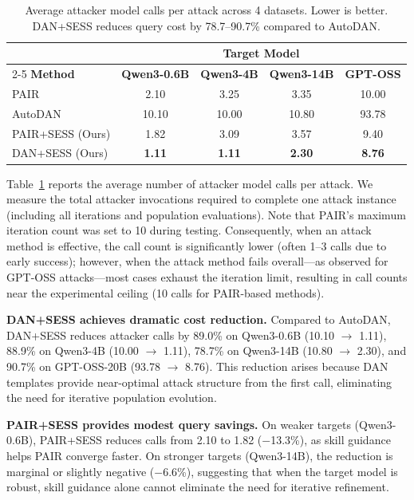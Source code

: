\documentclass[letterpaper]{article}
\begin{document}
\begin{table}[t]
\centering
\caption{Average attacker model calls per attack across 4 datasets. Lower is better. DAN+SESS reduces query cost by 78.7--90.7\% compared to AutoDAN.}
\label{tab:efficiency}
\footnotesize
\setlength{\tabcolsep}{0.5pt}
\begin{tabular}{lcccc}
\toprule
& \multicolumn{4}{c}{\textbf{Target Model}} \\
\cmidrule(lr){2-5}
\textbf{Method} & \textbf{Qwen3-0.6B} & \textbf{Qwen3-4B} & \textbf{Qwen3-14B} & \textbf{GPT-OSS} \\
\midrule
PAIR & 2.10 & 3.25 & 3.35 & 10.00 \\
AutoDAN & 10.10 & 10.00 & 10.80 & 93.78 \\
\midrule
PAIR+SESS (Ours) & 1.82 & 3.09 & 3.57 & 9.40 \\
DAN+SESS (Ours) & \textbf{1.11} & \textbf{1.11} & \textbf{2.30} & \textbf{8.76} \\
\bottomrule
\end{tabular}
\end{table}

Table~\ref{tab:efficiency} reports the average number of attacker model calls per attack. We measure the total attacker invocations required to complete one attack instance (including all iterations and population evaluations). Note that PAIR's maximum iteration count was set to 10 during testing. Consequently, when an attack method is effective, the call count is significantly lower (often 1--3 calls due to early success); however, when the attack method fails overall---as observed for GPT-OSS attacks---most cases exhaust the iteration limit, resulting in call counts near the experimental ceiling (10 calls for PAIR-based methods).

\textbf{DAN+SESS achieves dramatic cost reduction.} Compared to AutoDAN, DAN+SESS reduces attacker calls by 89.0\% on Qwen3-0.6B (10.10 $\to$ 1.11), 88.9\% on Qwen3-4B (10.00 $\to$ 1.11), 78.7\% on Qwen3-14B (10.80 $\to$ 2.30), and 90.7\% on GPT-OSS-20B (93.78 $\to$ 8.76). This reduction arises because DAN templates provide near-optimal attack structure from the first call, eliminating the need for iterative population evolution.

\textbf{PAIR+SESS provides modest query savings.} On weaker targets (Qwen3-0.6B), PAIR+SESS reduces calls from 2.10 to 1.82 ($-$13.3\%), as skill guidance helps PAIR converge faster. On stronger targets (Qwen3-14B), the reduction is marginal or slightly negative ($-$6.6\%), suggesting that when the target model is robust, skill guidance alone cannot eliminate the need for iterative refinement.
\end{document}
